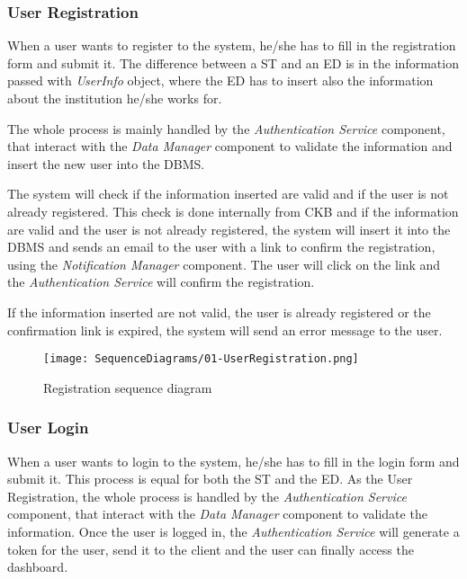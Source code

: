 \subsubsection*{User Registration}
\label{ss:registration_diagram}%
When a user wants to register to the system, he/she has to fill in the registration form and submit it. The difference between a ST and an ED is in the information passed with \textit{UserInfo} object, where the ED has to insert also the information about the institution he/she works for.

The whole process is mainly handled by the \textit{Authentication Service} component, that interact with the \textit{Data Manager} component to validate the information and insert the new user into the DBMS.

The system will check if the information inserted are valid and if the user is not already registered. This check is done internally from CKB and if the information are valid and the user is not already registered, the system will insert it into the DBMS and sends an email to the user with a link to confirm the registration, using the \textit{Notification Manager} component. The user will click on the link and the \textit{Authentication Service} will confirm the registration.

If the information inserted are not valid, the user is already registered or the confirmation link is expired, the system will send an error message to the user.

\begin{figure}[H]
  \centering
  \texttt{[image: SequenceDiagrams/01-UserRegistration.png]}
  \caption{Registration sequence diagram}
  \label{fig:registratio_diagramn}
\end{figure}

\subsubsection*{User Login}
\label{ss:login_diagram}%
When a user wants to login to the system, he/she has to fill in the login form and submit it. This process is equal for both the ST and the ED. As the User Registration, the whole process is handled by the \textit{Authentication Service} component, that interact with the \textit{Data Manager} component to validate the information. Once the user is logged in, the \textit{Authentication Service} will generate a token for the user, send it to the client and the user can finally access the dashboard.

